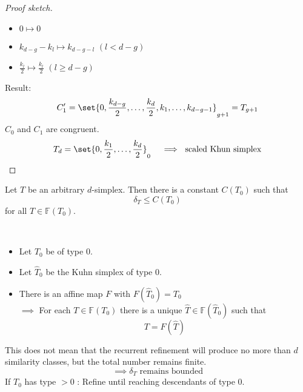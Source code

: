 \begin{proof}[Proof sketch]
\begin{enumerate}
			\begin{itemize}
				\item $0 \mapsto 0$
				\item $k_{d-g}-k_{l} \mapsto k_{d-g-l}$ $(l< d-g)$
				\item $\frac{k_{l}}{2}\mapsto \frac{k_{l}}{2}$ $(l \geq d-g)$
			\end{itemize}
	\end{enumerate}
	Result:
	\begin{equation*}
		C'_{1}= \set{ 0, \frac{k_{d-g}}{2},\dots ,\frac{k_{d}}{2},k_{1},\dots ,k_{d-g-1} }_{g+1} = T_{g+1}
	\end{equation*}
	$C_{0}$ and $C_{1}$ are congruent.
	\begin{equation*}
		T_{d}= \set{ 0, \frac{k_{1}}{2},\dots ,\frac{k_{d}}{2} }_{0} \quad \implies \text{ scaled Khun simplex} \qedhere
	\end{equation*}
\end{proof}
\begin{theorem}
	Let $T$ be an arbitrary $d$-simplex. Then there is a constant $C(T_{0})$ such that
	\begin{equation*}
		\delta_{T} \leq C(T_{0})
	\end{equation*}
	for all $T \in \mathbb{F}(T_{0})$.
\end{theorem}
\begin{proof_}\
	\begin{itemize}
		\item Let $T_{0}$ be of type 0.
		\item Let $\hat{T}_{0}$ be the Kuhn simplex of type 0.
		\item There is an affine map $F$ with $F(\hat{T}_{0})=T_{0}$ \\
			$\implies$ For each $T \in \mathbb{F}(T_{0})$ there is a unique $\hat{T} \in \mathbb{F}(\hat{T}_{0})$ such that
			\begin{equation*}
				T = F(\hat{T})
			\end{equation*}
			
	\end{itemize}
	This does not mean that the recurrent refinement will produce no more than $d$ similarity classes, but the total number remains finite.
	 \begin{equation*}
		 \implies \delta_{T} \text{ remains bounded}
	\end{equation*}
	If $T_{0}$ has type $>0$ : Refine until reaching descendants of type $0$.
\end{proof_}



